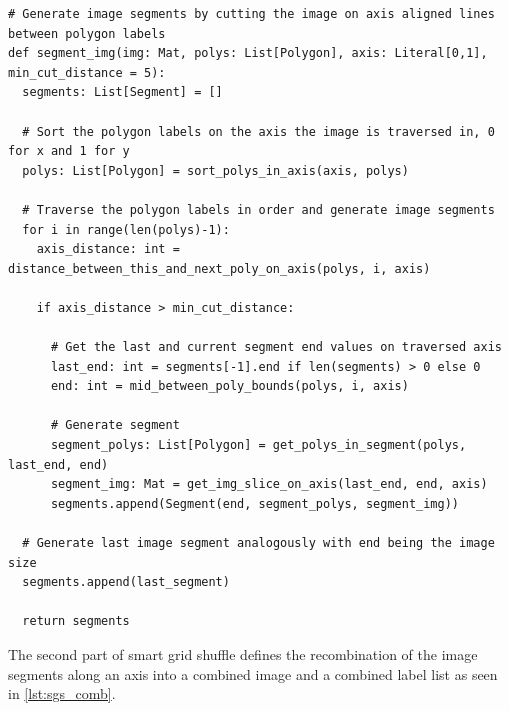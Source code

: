 \documentclass[10pt]{book}
\newenvironment{code}{\captionsetup{type=listing}}{}
\begin{document}





\begin{code}
\label{lst:sgs_cut}
\begin{verbatim}
# Generate image segments by cutting the image on axis aligned lines between polygon labels
def segment_img(img: Mat, polys: List[Polygon], axis: Literal[0,1], min_cut_distance = 5):
  segments: List[Segment] = []
  
  # Sort the polygon labels on the axis the image is traversed in, 0 for x and 1 for y
  polys: List[Polygon] = sort_polys_in_axis(axis, polys)
  
  # Traverse the polygon labels in order and generate image segments
  for i in range(len(polys)-1):
    axis_distance: int = distance_between_this_and_next_poly_on_axis(polys, i, axis)

    if axis_distance > min_cut_distance:

      # Get the last and current segment end values on traversed axis 
      last_end: int = segments[-1].end if len(segments) > 0 else 0
      end: int = mid_between_poly_bounds(polys, i, axis)

      # Generate segment
      segment_polys: List[Polygon] = get_polys_in_segment(polys, last_end, end)
      segment_img: Mat = get_img_slice_on_axis(last_end, end, axis)
      segments.append(Segment(end, segment_polys, segment_img))

  # Generate last image segment analogously with end being the image size
  segments.append(last_segment)
  
  return segments
\end{verbatim}
\end{code}

The second part of smart grid shuffle defines the recombination of the image segments along an axis into a combined image and a combined label list as seen in \autoref{lst:sgs_comb}.
\end{document}
